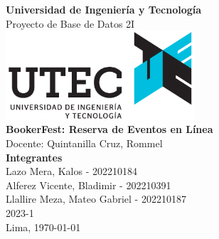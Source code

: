 \documentclass[a4paper, 11pt, oneside]{article}
\begin{document}
    \begin{titlepage}
        \begin{center}
            \vfill
            \Large \textbf{Universidad de Ingeniería y Tecnología}\\[.5cm]
            \large Proyecto de Base de Datos 2I\\[1cm]
            \vfill
            \includegraphics[width=7cm]{figures/utecLogo.png}\\[1cm]
            \vfill
            \Large \textbf{BookerFest: Reserva de Eventos en Línea}\\[.5cm]
            \large Docente: Quintanilla Cruz, Rommel\\[1cm]
            \vfill
            \Large \textbf{Integrantes}\\[0.5cm]
            \large Lazo Mera, Kalos - 202210184\\[0.2cm]
            \large Alferez Vicente, Bladimir - 202210391\\[0.2cm]
            \large Llallire Meza, Mateo Gabriel - 202210187\\[2cm]
            \vfill
            {\large 2023-1}\\[0.5cm]
            {\large Lima, \today}\\[0.5cm]
            \vfill
        \end{center}
    \end{titlepage}

    \newpage
    \onehalfspacing 
    \tableofcontents
    \setlength\parindent{0pt}

    
    
    
\end{document}

